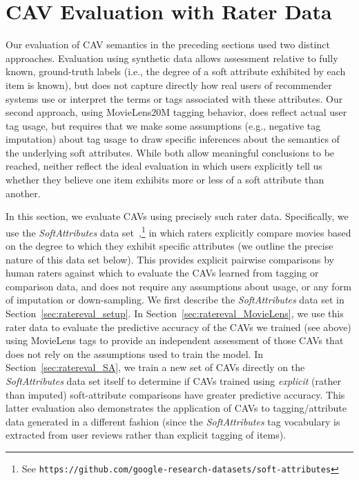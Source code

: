 \documentclass[manuscript,screen,nonacm]{acmart}
\newcommand{\1}{{\mathbf 1}}
\theoremstyle{TheoremNum}
\begin{document}
\section{CAV Evaluation with Rater Data}
\label{sec:user_study}

Our evaluation of CAV semantics in the preceding sections used two distinct approaches. Evaluation using synthetic data allows assessment relative to fully known, ground-truth labels (i.e., the degree of a soft attribute exhibited by each item is known), but does not capture directly how real users of recommender systems use or interpret the terms or tags associated with these attributes.
Our second approach, using MovieLens20M tagging behavior, does reflect actual user tag usage, but requires that we make some assumptions (e.g., negative tag imputation) about tag usage to draw specific inferences about the semantics of the underlying soft attributes. While both allow meaningful conclusions to be reached, neither reflect the ideal evaluation in which users explicitly tell us whether they believe one item exhibits more or less of a soft attribute than another.

In this section, we evaluate CAVs using precisely such rater data. Specifically, we use the \emph{SoftAttributes} data set~\cite{sigir21:filipandkristian},\footnote{See \texttt{https://github.com/google-research-datasets/soft-attributes}} in which raters explicitly compare movies based on the degree to which they exhibit specific attributes (we outline the precise nature of this data set below). This provides explicit pairwise comparisons by human raters against which to evaluate the CAVs learned from tagging or comparison data, and does not require any assumptions about usage, or any form of imputation or down-sampling. We first describe the \emph{SoftAttributes} data set in Section~\ref{sec:ratereval_setup}. In Section~\ref{sec:ratereval_MovieLens}, we use this rater data to evaluate the predictive accuracy of the CAVs we trained (see above) using MovieLens tags to provide an independent assessment of those CAVs that does not rely on the assumptions used to train the model. In Section~\ref{sec:ratereval_SA}, we train a new set of CAVs directly on the \emph{SoftAttributes} data set itself to determine if CAVs trained using \emph{explicit} (rather than imputed) soft-attribute comparisons have greater predictive accuracy. This latter evaluation also demonstrates the application of CAVs to tagging/attribute data generated in a different fashion (since the \emph{SoftAttributes} tag vocabulary is extracted from user reviews rather than explicit tagging of items).
\end{document}
